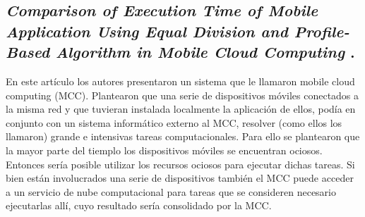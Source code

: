 \subsection{
    \textbf{\emph{Comparison of Execution Time of Mobile
            Application Using Equal Division
            and Profile-Based Algorithm in Mobile
            Cloud Computing}
    }
    \cite[pág. 59]{chaudhary_microservices_2020}.
}

En este artículo los autores presentaron un sistema que le llamaron mobile cloud computing (MCC).
Plantearon que una serie de dispositivos móviles conectados a la misma red y que tuvieran instalada localmente la aplicación de ellos, podía en conjunto con un sistema informático externo al MCC, resolver (como ellos los llamaron) grande e intensivas tareas computacionales. Para ello se plantearon que la mayor parte del tiemplo los dispositivos móviles se encuentran ociosos. Entonces sería posible utilizar los recursos ociosos para ejecutar dichas tareas. Si bien están involucrados una serie de dispositivos también el MCC puede acceder a un servicio de nube computacional para tareas que se consideren necesario ejecutarlas allí, cuyo resultado sería consolidado por la MCC.\par

